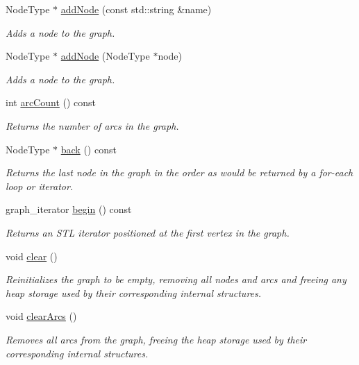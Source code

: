 \begin{DoxyCompactItemize}
Node\+Type $\ast$ \mbox{\hyperlink{classGraph_acd763aa09491315536b5d2734cd82b89}{add\+Node}} (const std\+::string \&name)
\begin{DoxyCompactList}\small\item\em Adds a node to the graph. \end{DoxyCompactList}\item 
Node\+Type $\ast$ \mbox{\hyperlink{classGraph_a635fa78d72315816cef6c091acfa3882}{add\+Node}} (Node\+Type $\ast$node)
\begin{DoxyCompactList}\small\item\em Adds a node to the graph. \end{DoxyCompactList}\item 
int \mbox{\hyperlink{classGraph_ac0b108b3354f5222d2c829dcd639fa7a}{arc\+Count}} () const
\begin{DoxyCompactList}\small\item\em Returns the number of arcs in the graph. \end{DoxyCompactList}\item 
Node\+Type $\ast$ \mbox{\hyperlink{classGraph_a27d59ef129bb56cc144ecc81c0affd34}{back}} () const
\begin{DoxyCompactList}\small\item\em Returns the last node in the graph in the order as would be returned by a for-\/each loop or iterator. \end{DoxyCompactList}\item 
graph\+\_\+iterator \mbox{\hyperlink{classGraph_aea3a8950c46f4ac913207201b685e715}{begin}} () const
\begin{DoxyCompactList}\small\item\em Returns an S\+TL iterator positioned at the first vertex in the graph. \end{DoxyCompactList}\item 
void \mbox{\hyperlink{classGraph_ac8bb3912a3ce86b15842e79d0b421204}{clear}} ()
\begin{DoxyCompactList}\small\item\em Reinitializes the graph to be empty, removing all nodes and arcs and freeing any heap storage used by their corresponding internal structures. \end{DoxyCompactList}\item 
void \mbox{\hyperlink{classGraph_a63f0ce1806df1c8070d997153363eecb}{clear\+Arcs}} ()
\begin{DoxyCompactList}\small\item\em Removes all arcs from the graph, freeing the heap storage used by their corresponding internal structures. \end{DoxyCompactList}\item 

\end{DoxyCompactItemize}
